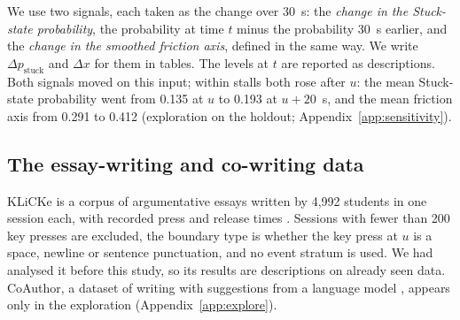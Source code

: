 We use two signals, each taken as the change over 30~s: the \emph{change in the Stuck-state probability}, the
probability at time $t$ minus the probability 30~s earlier, and the \emph{change in the smoothed friction axis}, defined
in the same way. We write $\Delta p_{\mathrm{stuck}}$ and $\Delta x$ for them in tables. The levels at $t$ are reported
as descriptions. Both signals moved on this input;
within stalls both rose after $u$: the mean
Stuck-state probability went from 0.135 at $u$ to 0.193 at $u + 20$~s, and the mean friction axis from 0.291 to 0.412
(exploration on the holdout; Appendix~\ref{app:sensitivity}).

\subsection{The essay-writing and co-writing data}

KLiCKe is a corpus of argumentative essays written by 4,992 students in one session each, with recorded press and
release times \cite{tian2025klicke}. Sessions with fewer than 200 key presses are excluded, the boundary type is whether
the key press at $u$ is a space, newline or sentence punctuation, and no event stratum is used. We had analysed it
before this study, so its results are descriptions on already seen data. CoAuthor, a dataset of writing with suggestions
from a language model \cite{lee2022coauthor}, appears only in the exploration (Appendix~\ref{app:explore}).
